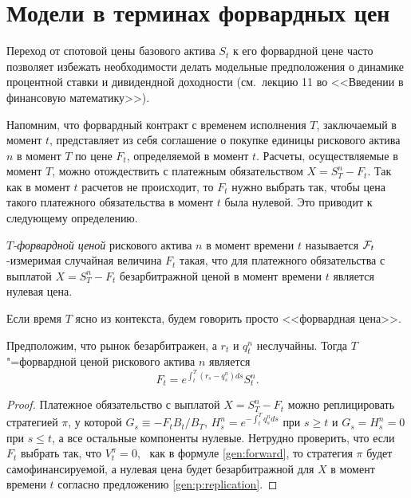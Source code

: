 \section{Модели в терминах форвардных цен}

Переход от спотовой цены базового актива $S_t$ к его форвардной цене часто позволяет избежать необходимости делать модельные предположения о динамике процентной ставки и дивидендной доходности (см.~лекцию 11 во <<Введении в финансовую математику>>).

Напомним, что форвардный контракт с временем исполнения $T$, заключаемый в момент $t$, представляет из себя соглашение о покупке единицы рискового актива $n$ в момент $T$ по цене $F_t$, определяемой в момент $t$. 
Расчеты, осуществляемые в момент $T$, можно отождествить с платежным обязательством $X=S_T^n - F_t$.
Так как в момент $t$ расчетов не происходит, то $F_t$ нужно выбрать так, чтобы цена такого платежного обязательства в момент $t$ была нулевой.
Это приводит к следующему определению.

\begin{definition}
\emph{$T$-форвардной ценой} рискового актива $n$ в момент времени $t$ называется $\mathcal{F}_t$-измеримая случайная величина $F_t$ такая, что для платежного обязательства с выплатой $X=S_T^n-F_t$ безарбитражной ценой в момент времени $t$ является нулевая цена.
\end{definition}

Если время $T$ ясно из контекста, будем говорить просто <<форвардная цена>>. 

\begin{proposition}
Предположим, что рынок безарбитражен, а $r_t$ и $q_t^n$ неслучайны.
Тогда $T$"=форвардной ценой рискового актива $n$ является
\begin{equation}
\label{gen:forward}
F_t =  e^{\int_t^T (r_s - q_s^n) ds} S_t^n.
\end{equation}
\end{proposition}

\begin{proof}
Платежное обязательство с выплатой $X=S_T^n - F_t$ можно реплицировать стратегией $\pi$, у которой $G_s \equiv -F_tB_t/B_T$, $H_s^n = e^{-\int_t^T q_s^n ds}$ при $s\ge t$ и $G_s=H_s^n=0$ при $s\le t$, а все остальные компоненты нулевые.
Нетрудно проверить, что если $F_t$ выбрать так, что $V_t^\pi = 0$, \te\ как в формуле \eqref{gen:forward}, то стратегия $\pi$ будет самофинансируемой, а нулевая цена будет безарбитражной для $X$ в момент времени $t$ согласно предложению \ref{gen:p:replication}.
\end{proof}

